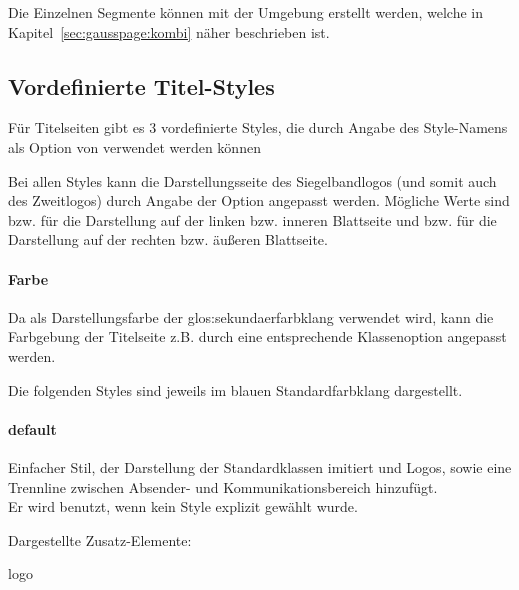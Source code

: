 Die Einzelnen Segmente können mit der Umgebung 
erstellt werden, welche in Kapitel~\ref{sec:gausspage:kombi} näher beschrieben ist.

\subsection{Vordefinierte Titel-Styles}\label{sec:titlestyles}


Für Titelseiten gibt es 3 vordefinierte Styles, die durch Angabe des
Style-Namens als Option von  verwendet werden können

\begin{Declaration}
\end{Declaration}

Bei allen Styles kann die Darstellungsseite des Siegelbandlogos
(und somit auch des Zweitlogos) durch Angabe der Option
 angepasst werden.
Mögliche Werte sind  bzw.  für die Darstellung
auf der linken bzw. inneren Blattseite und  bzw. 
für die Darstellung auf der rechten bzw. äußeren Blattseite.

\paragraph{Farbe}
Da als Darstellungsfarbe der \gls{glos:sekundaerfarbklang} verwendet wird,
kann die Farbgebung der Titelseite z.B. durch eine entsprechende Klassenoption
angepasst werden.

Die folgenden Styles sind jeweils im blauen Standardfarbklang dargestellt.


  \begin{minipage}[t]{0.33\textwidth}
    \null\centering\sffamily
  \end{minipage}%
  \hfill
  \begin{minipage}[t]{0.6\textwidth}
    \paragraph{default}
    Einfacher Stil, der Darstellung der Standardklassen imitiert und Logos,
    sowie eine Trennline zwischen Absender- und Kommunikationsbereich hinzufügt.
    \\
    Er wird benutzt, wenn kein Style explizit gewählt wurde.
    \par\bigskip
    \par\bigskip
    Dargestellte Zusatz-Elemente:
    \begin{compactitem}\ttfamily
      \item logo
    \end{compactitem}
  \end{minipage}
  
